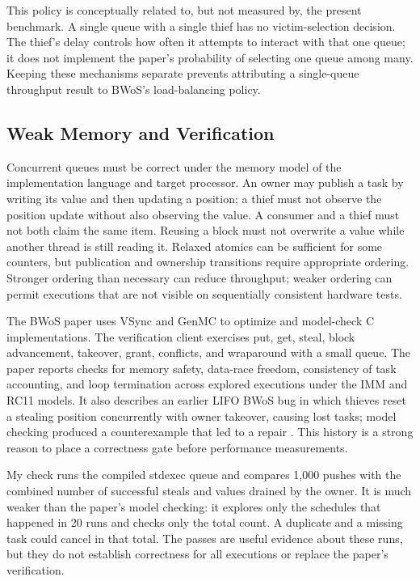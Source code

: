 \documentclass[conference]{IEEEtran}
\begin{document}
This policy is conceptually related to, but not measured by, the present benchmark. A single queue with a single thief has no victim-selection decision. The thief's delay controls how often it attempts to interact with that one queue; it does not implement the paper's probability of selecting one queue among many. Keeping these mechanisms separate prevents attributing a single-queue throughput result to BWoS's load-balancing policy.

\subsection{Weak Memory and Verification}
Concurrent queues must be correct under the memory model of the implementation language and target processor. An owner may publish a task by writing its value and then updating a position; a thief must not observe the position update without also observing the value. A consumer and a thief must not both claim the same item. Reusing a block must not overwrite a value while another thread is still reading it. Relaxed atomics can be sufficient for some counters, but publication and ownership transitions require appropriate ordering. Stronger ordering than necessary can reduce throughput; weaker ordering can permit executions that are not visible on sequentially consistent hardware tests.

The BWoS paper uses VSync and GenMC to optimize and model-check C implementations. The verification client exercises put, get, steal, block advancement, takeover, grant, conflicts, and wraparound with a small queue. The paper reports checks for memory safety, data-race freedom, consistency of task accounting, and loop termination across explored executions under the IMM and RC11 models. It also describes an earlier LIFO BWoS bug in which thieves reset a stealing position concurrently with owner takeover, causing lost tasks; model checking produced a counterexample that led to a repair \cite{wang2023bwos}. This history is a strong reason to place a correctness gate before performance measurements.

My check runs the compiled stdexec queue and compares 1,000 pushes with the combined number of successful steals and values drained by the owner. It is much weaker than the paper's model checking: it explores only the schedules that happened in 20 runs and checks only the total count. A duplicate and a missing task could cancel in that total. The passes are useful evidence about these runs, but they do not establish correctness for all executions or replace the paper's verification.
\end{document}
